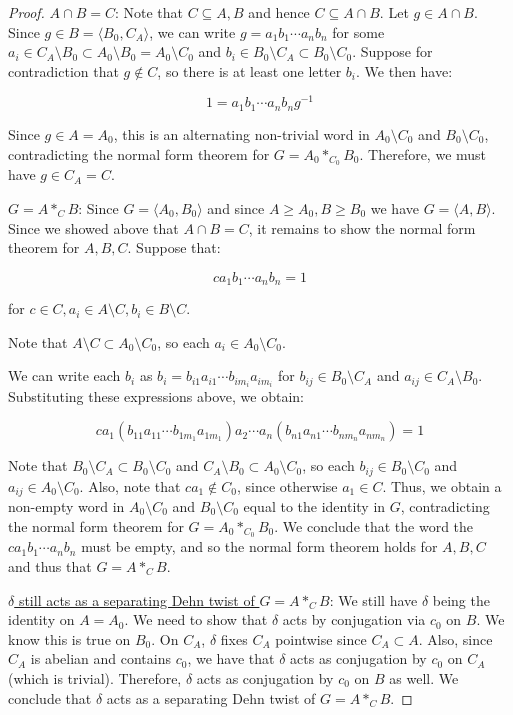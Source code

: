 \documentclass{amsart}
\newcommand{\vs}{\vspace{10pt}}
\theoremstyle{plain}
\theoremstyle{definition}
\theoremstyle{remark}
\begin{document}
\begin{proof}
\vs 


\underline{$A \cap B = C$}: Note that $C \subseteq A,B$ and hence $C \subseteq A \cap B$. Let $g \in A \cap B$. Since $g \in B = \langle B_0, C_A \rangle$, we can write $g = a_1 b_1 \cdots a_n b_n$ for some $a_i \in C_A \setminus B_0 \subset A_0 \setminus B_0 = A_0 \setminus C_0$ and $b_i \in B_0 \setminus C_A \subset B_0 \setminus C_0$. Suppose for contradiction that $g \notin C$, so there is at least one letter $b_i$. We then have: 

$$1 = a_1 b_1 \cdots a_n b_n g^{-1}$$

Since $g \in A = A_0$, this is an alternating non-trivial word in $A_0 \setminus C_0$ and $B_0 \setminus C_0$, contradicting the normal form theorem for $G = A_0 *_{C_0} B_0$. Therefore, we must have $g \in C_A = C$. 

\vs

\underline{$G = A *_C B$}: Since $G = \langle A_0, B_0 \rangle$ and since $A \geq A_0, B \geq B_0$ we have $G = \langle A, B\rangle$. Since we showed above that $A \cap B = C$, it remains to show the normal form theorem for $A,B,C$. Suppose that: 

$$c a_1 b_1 \cdots a_n b_n = 1$$

for $c \in C, a_i \in A \setminus C, b_i \in B \setminus C$. 


Note that $A \setminus C \subset A_0 \setminus C_0$, so each $a_i \in A_0 \setminus C_0$. 

We can write each $b_i$ as $b_i = b_{i1}a_{i1} \cdots b_{im_i} a_{im_i}$ for $b_{ij} \in B_0 \setminus C_A$ and $a_{ij} \in C_A \setminus B_0$.  Substituting these expressions above, we obtain: 

$$ c a_1 (b_{11}a_{11} \cdots b_{1m_1} a_{1m_1})a_2 \cdots a_n (b_{n1}a_{n1} \cdots b_{nm_n} a_{nm_n}) = 1 $$

Note that $B_0 \setminus C_A \subset B_0 \setminus C_0$ and $C_A \setminus B_0 \subset A_0 \setminus C_0$, so each $b_{ij} \in B_0 \setminus C_0$ and $a_{ij} \in A_0 \setminus C_0$. Also, note that $ca_1 \notin C_0$, since otherwise $a_1 \in C$. Thus, we obtain a non-empty word in $A_0 \setminus C_0$ and $B_0 \setminus C_0$ equal to the identity in $G$, contradicting the normal form theorem for $G = A_0 *_{C_0} B_0$. We conclude that the word the $c a_1 b_1 \cdots a_n b_n$ must be empty, and so the normal form theorem holds for $A,B,C$ and thus that $G = A *_C B$. 

\vs 

\underline{$\delta$ still acts as a separating Dehn twist of $G = A *_C B$}: We still have $\delta$ being the identity on $A = A_0$. We need to show that $\delta$ acts by conjugation via $c_0$ on $B$. We know this is true on $B_0$. On $C_A$, $\delta$ fixes $C_A$ pointwise since $C_A \subset A$. Also, since $C_A$ is abelian and contains $c_0$, we have that $\delta$ acts as conjugation by $c_0$ on $C_A$ (which is trivial). Therefore, $\delta$ acts as conjugation by $c_0$ on $B$ as well. We conclude that $\delta$ acts as a separating Dehn twist of $G = A *_C B$. 


\end{proof}
\end{document}
